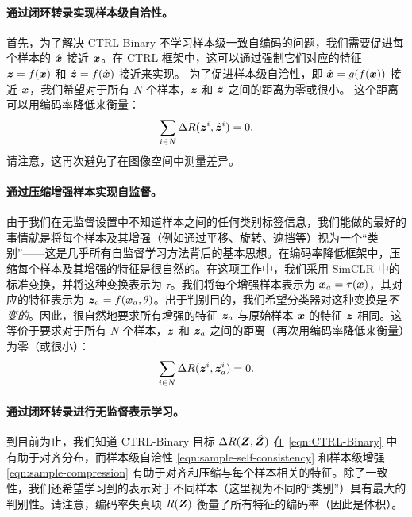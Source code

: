 \documentclass[../../book-main_zh.tex]{subfiles}
\begin{document}
\paragraph{通过闭环转录实现样本级自洽性。} 
首先，为了解决 CTRL-Binary 不学习样本级一致自编码的问题，我们需要促进每个样本的 $\hat {\bm{x}}$ 接近 $\bm{x}$。在 CTRL 框架中，这可以通过强制它们对应的特征 $\bm{z}=f(\bm{x})$ 和 $\hat {\bm{z}} = f(\hat {\bm{x}})$ 接近来实现。
为了促进样本级自洽性，即 $\hat{\bm{x}} = g(f(\bm{x}))$ 接近 $\bm{x}$，我们希望对于所有 $N$ 个样本，$\bm{z}$ 和 $\hat{\bm{z}}$ 之间的距离为零或很小。
这个距离可以用编码率降低来衡量：
\begin{align}
\sum_{i\in N} \Delta R(\z^i,\hat{\z}^i) = 0.
\label{eqn:sample-self-consistency}\vspace{-2mm}
\end{align}
请注意，这再次避免了在图像空间中测量差异。

\paragraph{通过压缩增强样本实现自监督。} 
由于我们在无监督设置中不知道样本之间的任何类别标签信息，我们能做的最好的事情就是将每个样本及其增强（例如通过平移、旋转、遮挡等）视为一个“类别”——这是几乎所有自监督学习方法背后的基本思想。在编码率降低框架中，压缩每个样本及其增强的特征是很自然的。在这项工作中，我们采用 SimCLR \cite{chen2020simple} 中的标准变换，并将这种变换表示为 $\tau$。我们将每个增强样本表示为 $\bm{x}_a = \tau(\bm{x})$，其对应的特征表示为 $\bm{z}_a = f(\bm{x}_a, \theta)$。出于判别目的，我们希望分类器对这种变换是{\em 不变的}。因此，很自然地要求所有增强的特征 $\bm{z}_a$ 与原始样本 $\bm{x}$ 的特征 $\bm{z}$ 相同。这等价于要求对于所有 $N$ 个样本，$\bm{z}$ 和 $\bm{z}_a$ 之间的距离（再次用编码率降低来衡量）为零（或很小）：
\begin{align}
\sum_{i\in N} \Delta R(\z^i,\z_{a}^i) = 0.
\label{eqn:sample-compression}\vspace{-3mm}
\end{align}


\paragraph{通过闭环转录进行无监督表示学习。} 
到目前为止，我们知道 CTRL-Binary 目标 $\Delta R(\bm{Z}, \hat{\bm{Z}})$ 在 \eqref{eqn:CTRL-Binary} 中有助于对齐分布，而样本级自洽性 \eqref{eqn:sample-self-consistency} 和样本级增强 \eqref{eqn:sample-compression} 有助于对齐和压缩与每个样本相关的特征。除了一致性，我们还希望学习到的表示对于不同样本（这里视为不同的“类别”）具有最大的判别性。请注意，编码率失真项 $R(\bm{Z})$ 衡量了所有特征的编码率（因此是体积）。%
\end{document}
